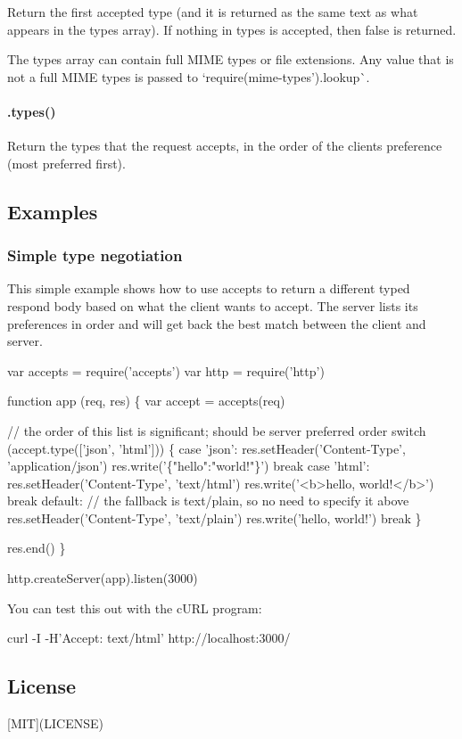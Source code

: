 Return the first accepted type (and it is returned as the same text as what appears in the {\ttfamily types} array). If nothing in {\ttfamily types} is accepted, then {\ttfamily false} is returned.

The {\ttfamily types} array can contain full M\+I\+ME types or file extensions. Any value that is not a full M\+I\+ME types is passed to `require(\textquotesingle{}mime-\/types').lookup\`{}.

\paragraph*{.types()}

Return the types that the request accepts, in the order of the client\textquotesingle{}s preference (most preferred first).

\subsection*{Examples}

\subsubsection*{Simple type negotiation}

This simple example shows how to use {\ttfamily accepts} to return a different typed respond body based on what the client wants to accept. The server lists it\textquotesingle{}s preferences in order and will get back the best match between the client and server.


\begin{DoxyCode}
var accepts = require('accepts')
var http = require('http')

function app (req, res) \{
  var accept = accepts(req)

  // the order of this list is significant; should be server preferred order
  switch (accept.type(['json', 'html'])) \{
    case 'json':
      res.setHeader('Content-Type', 'application/json')
      res.write('\{"hello":"world!"\}')
      break
    case 'html':
      res.setHeader('Content-Type', 'text/html')
      res.write('<b>hello, world!</b>')
      break
    default:
      // the fallback is text/plain, so no need to specify it above
      res.setHeader('Content-Type', 'text/plain')
      res.write('hello, world!')
      break
  \}

  res.end()
\}

http.createServer(app).listen(3000)
\end{DoxyCode}


You can test this out with the c\+U\+RL program\+: 
\begin{DoxyCode}
curl -I -H'Accept: text/html' http://localhost:3000/
\end{DoxyCode}


\subsection*{License}

\mbox{[}M\+IT\mbox{]}(L\+I\+C\+E\+N\+SE) 